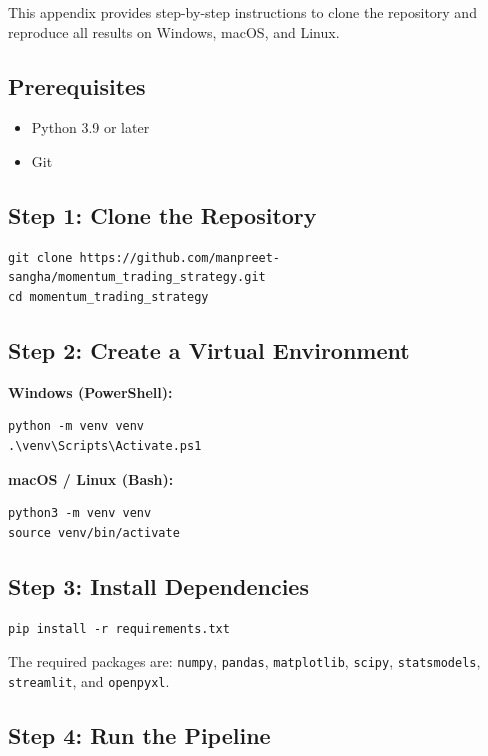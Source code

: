\documentclass[10pt]{article}
\begin{document}
This appendix provides step-by-step instructions to clone the repository and reproduce all results on Windows, macOS, and Linux.

\subsection*{Prerequisites}
\begin{itemize}[nosep]
    \item Python 3.9 or later
    \item Git
\end{itemize}

\subsection*{Step 1: Clone the Repository}

\begin{verbatim}
git clone https://github.com/manpreet-sangha/momentum_trading_strategy.git
cd momentum_trading_strategy
\end{verbatim}

\subsection*{Step 2: Create a Virtual Environment}

\textbf{Windows (PowerShell):}
\begin{verbatim}
python -m venv venv
.\venv\Scripts\Activate.ps1
\end{verbatim}

\textbf{macOS / Linux (Bash):}
\begin{verbatim}
python3 -m venv venv
source venv/bin/activate
\end{verbatim}

\subsection*{Step 3: Install Dependencies}

\begin{verbatim}
pip install -r requirements.txt
\end{verbatim}

\noindent The required packages are: \texttt{numpy}, \texttt{pandas}, \texttt{matplotlib}, \texttt{scipy}, \texttt{statsmodels}, \texttt{streamlit}, and \texttt{openpyxl}.

\subsection*{Step 4: Run the Pipeline}
\end{document}
